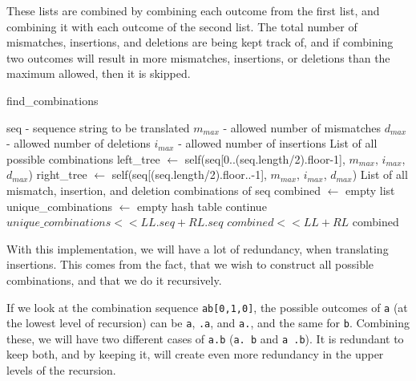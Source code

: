 \documentclass[12pt]{article}
\theoremstyle{definition}
\newcounter{subsubsubsection}[subsubsection]
\newcommand*\Let[2]{\State #1 $\gets$ #2}
\newcommand*\Returns[1]{\State \Return #1}
\newcommand*\Append[2]{\State $#1 << #2$}
\begin{document}
These lists are combined by combining each outcome from the first list, and combining it with each outcome of the second list. The total number of mismatches, insertions, and deletions are being kept track of, and if combining two outcomes will result in more mismatches, insertions, or deletions than the maximum allowed, then it is skipped.

\begin{spacing}{0.8}
\begin{algorithm}
	\caption{find\_combinations}
	\label{alg:find_combinations}
  	\begin{algorithmic}[1]
    		\Require
    			\Statex seq - sequence string to be translated
    			\Statex $m_{max}$ - allowed number of mismatches
    			\Statex $d_{max}$ - allowed number of deletions
    			\Statex $i_{max}$ - allowed number of insertions
    		\Ensure
    			\Statex List of all possible combinations
		\Statex
    			\Let{left\_tree}{self(seq[0..(seq.length/2).floor-1], $m_{max}$, $i_{max}$, $d_{max}$)}
    			\Let{right\_tree}{self(seq[(seq.length/2).floor..-1], $m_{max}$, $i_{max}$, $d_{max}$)}
    		\Else
    			\Returns{List of all mismatch, insertion, and deletion combinations of seq}
    		\EndIf
    		\State
    		\Let{combined}{empty list}
    		\Let{unique\_combinations}{empty hash table}
    		 
    			 
    					\State continue
    				\EndIf
    					\Append{unique\_combinations}{LL.seq + RL.seq}
    					\Append{combined}{LL + RL}
    				\EndIf
    			\EndFor
    		\EndFor
    		\Returns{combined}
  	\end{algorithmic}
\end{algorithm}
\end{spacing}

\newpage
{}

With this implementation, we will have a lot of redundancy, when translating insertions. This comes from the fact, that we wish to construct all possible combinations, and that we do it recursively.

If we look at the combination sequence \texttt{ab[0,1,0]}, the possible outcomes of \texttt{a} (at the lowest level of recursion) can be \texttt{a}, \texttt{.a}, and \texttt{a.}, and the same for \texttt{b}. Combining these, we will have two different cases of \texttt{a.b} (\texttt{a. b} and \texttt{a .b}). It is redundant to keep both, and by keeping it, will create even more redundancy in the upper levels of the recursion.
\end{document}
